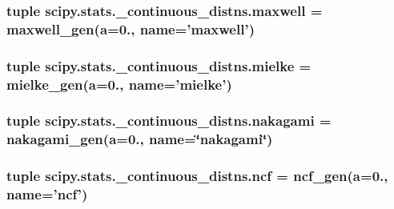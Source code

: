 \subsubsection[{maxwell}]{\setlength{\rightskip}{0pt plus 5cm}tuple scipy.\+stats.\+\_\+continuous\+\_\+distns.\+maxwell = {\bf maxwell\+\_\+gen}({\bf a}=0., name='maxwell')}\label{namespacescipy_1_1stats_1_1__continuous__distns_a3d8604c0c0a2257409743eff0ce2955e}
\hypertarget{namespacescipy_1_1stats_1_1__continuous__distns_a48c09a3fec0c2c5b9c76f3f192d1078b}{}
\subsubsection[{mielke}]{\setlength{\rightskip}{0pt plus 5cm}tuple scipy.\+stats.\+\_\+continuous\+\_\+distns.\+mielke = {\bf mielke\+\_\+gen}({\bf a}=0., name='mielke')}\label{namespacescipy_1_1stats_1_1__continuous__distns_a48c09a3fec0c2c5b9c76f3f192d1078b}
\hypertarget{namespacescipy_1_1stats_1_1__continuous__distns_a70d90f84b78588e5dccaa41d0f221531}{}
\subsubsection[{nakagami}]{\setlength{\rightskip}{0pt plus 5cm}tuple scipy.\+stats.\+\_\+continuous\+\_\+distns.\+nakagami = {\bf nakagami\+\_\+gen}({\bf a}=0., name=\char`\"{}nakagami\char`\"{})}\label{namespacescipy_1_1stats_1_1__continuous__distns_a70d90f84b78588e5dccaa41d0f221531}
\hypertarget{namespacescipy_1_1stats_1_1__continuous__distns_af685a3cd05a6b7b0ff6d24d97f89bca6}{}
\subsubsection[{ncf}]{\setlength{\rightskip}{0pt plus 5cm}tuple scipy.\+stats.\+\_\+continuous\+\_\+distns.\+ncf = {\bf ncf\+\_\+gen}({\bf a}=0., name='ncf')}\label{namespacescipy_1_1stats_1_1__continuous__distns_af685a3cd05a6b7b0ff6d24d97f89bca6}
\hypertarget{namespacescipy_1_1stats_1_1__continuous__distns_ad4bd965f05614335ce2cb7533994446d}{}
